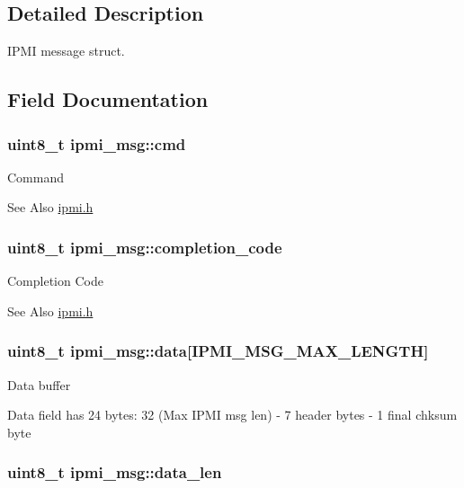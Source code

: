 \subsection{Detailed Description}
I\-P\-M\-I message struct. 

\subsection{Field Documentation}
\hypertarget{structipmi__msg_ac61985f05387f5e23043c569903cc234}{
\subsubsection[{cmd}]{\setlength{\rightskip}{0pt plus 5cm}uint8\-\_\-t ipmi\-\_\-msg\-::cmd}}\label{structipmi__msg_ac61985f05387f5e23043c569903cc234}
Command \begin{DoxySeeAlso}{See Also}
\hyperlink{ipmi_8h}{ipmi.\-h} 
\end{DoxySeeAlso}
\hypertarget{structipmi__msg_ab231f756803561da0a67de90703df5a7}{
\subsubsection[{completion\-\_\-code}]{\setlength{\rightskip}{0pt plus 5cm}uint8\-\_\-t ipmi\-\_\-msg\-::completion\-\_\-code}}\label{structipmi__msg_ab231f756803561da0a67de90703df5a7}
Completion Code \begin{DoxySeeAlso}{See Also}
\hyperlink{ipmi_8h}{ipmi.\-h} 
\end{DoxySeeAlso}
\hypertarget{structipmi__msg_a1151a6e64b5aed9d45abf0a92177a3fd}{
\subsubsection[{data}]{\setlength{\rightskip}{0pt plus 5cm}uint8\-\_\-t ipmi\-\_\-msg\-::data\mbox{[}{\bf I\-P\-M\-I\-\_\-\-M\-S\-G\-\_\-\-M\-A\-X\-\_\-\-L\-E\-N\-G\-T\-H}\mbox{]}}}\label{structipmi__msg_a1151a6e64b5aed9d45abf0a92177a3fd}
Data buffer \par
 Data field has 24 bytes\-: 32 (Max I\-P\-M\-I msg len) -\/ 7 header bytes -\/ 1 final chksum byte \hypertarget{structipmi__msg_ab45a4f31a5fb3c2e3f7d0300984c75fc}{
\subsubsection[{data\-\_\-len}]{\setlength{\rightskip}{0pt plus 5cm}uint8\-\_\-t ipmi\-\_\-msg\-::data\-\_\-len}}\label{structipmi__msg_ab45a4f31a5fb3c2e3f7d0300984c75fc}
